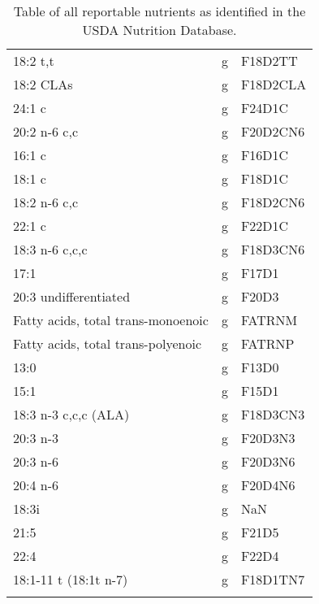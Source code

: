 \documentclass[]{scrartcl}
\begin{document}
\begin{longtable}{lll}
	18:2 t,t                           &     g &     F18D2TT \\
	18:2 CLAs                          &     g &    F18D2CLA \\
	24:1 c                             &     g &      F24D1C \\
	20:2 n-6 c,c                       &     g &    F20D2CN6 \\
	16:1 c                             &     g &      F16D1C \\
	18:1 c                             &     g &      F18D1C \\
	18:2 n-6 c,c                       &     g &    F18D2CN6 \\
	22:1 c                             &     g &      F22D1C \\
	18:3 n-6 c,c,c                     &     g &    F18D3CN6 \\
	17:1                               &     g &       F17D1 \\
	20:3 undifferentiated              &     g &       F20D3 \\
	Fatty acids, total trans-monoenoic &     g &      FATRNM \\
	Fatty acids, total trans-polyenoic &     g &      FATRNP \\
	13:0                               &     g &       F13D0 \\
	15:1                               &     g &       F15D1 \\
	18:3 n-3 c,c,c (ALA)               &     g &    F18D3CN3 \\
	20:3 n-3                           &     g &     F20D3N3 \\
	20:3 n-6                           &     g &     F20D3N6 \\
	20:4 n-6                           &     g &     F20D4N6 \\
	18:3i                              &     g &         NaN \\
	21:5                               &     g &       F21D5 \\
	22:4                               &     g &       F22D4 \\
	18:1-11 t (18:1t n-7)              &     g &    F18D1TN7 \\
	\caption{Table of all reportable nutrients as identified in the USDA Nutrition Database.\label{App:NutTable}}
\end{longtable}
\end{document}
